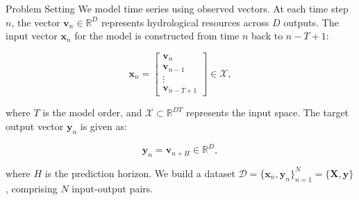 \begin{frame}{Problem Setting}
	We model time series using observed vectors. At each time step \(n\), the vector \(\mathbf{v}_n \in \mathbb{R}^D\) represents hydrological resources across \(D\) outputs. The input vector \(\mathbf{x}_n\) for the model is constructed from time \(n\) back to \(n-T+1\):
	
	\begin{equation*}
		\mathbf{x}_n = \begin{bmatrix} 
			\mathbf{v}_{n}\\ 
			\mathbf{v}_{n-1} \\ 
			\vdots \\ 
			\mathbf{v}_{n-T+1}
		\end{bmatrix} \in \mathcal{X},
	\end{equation*}
	
	where \(T\) is the model order, and \(\mathcal{X}\subset \mathbb{R}^{DT}\) represents the input space. The target output vector \(\mathbf{y}_n\) is given as:
	
	\begin{equation*}
		\mathbf{y}_n = \mathbf{v}_{n+H} \in \mathbb{R}^{D},
	\end{equation*}
	
	where \(H\) is the prediction horizon. We build a dataset \(\mathcal{D} = \{\mathbf{x}_n, \mathbf{y}_n\}_{n=1}^N  = \{\mathbf{X}, \mathbf{y}\}\), comprising \(N\) input-output pairs.
\end{frame}




